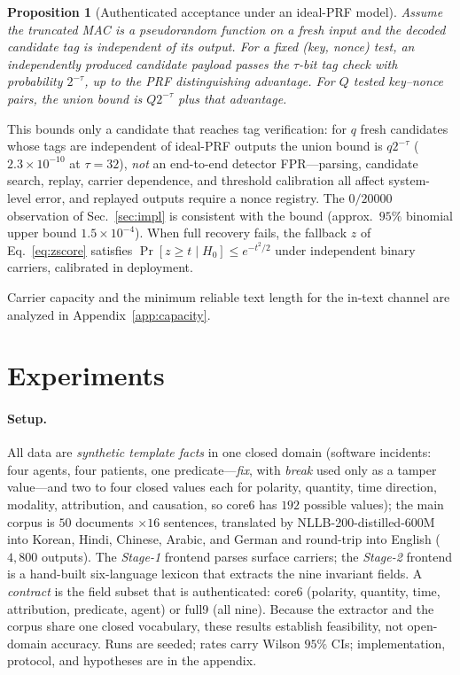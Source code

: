 \documentclass[journal]{IEEEtran}
\newtheorem{proposition}{Proposition}
\begin{document}
\begin{proposition}[Authenticated acceptance under an ideal-PRF model]
\label{thm:fpr}
Assume the truncated MAC is a pseudorandom function on a fresh input and the decoded candidate tag is independent of its output. For a fixed (key, nonce) test, an independently produced candidate payload passes the $\tau$-bit tag check with probability $2^{-\tau}$, up to the PRF distinguishing advantage. For $Q$ tested key--nonce pairs, the union bound is $Q2^{-\tau}$ plus that advantage.
\end{proposition}
This bounds only a candidate that reaches tag verification: for $q$ fresh candidates whose tags are independent of ideal-PRF outputs the union bound is $q2^{-\tau}$ ($2.3\times10^{-10}$ at $\tau{=}32$), \emph{not} an end-to-end detector FPR---parsing, candidate search, replay, carrier dependence, and threshold calibration all affect system-level error, and replayed outputs require a nonce registry. The $0/20000$ observation of Sec.~\ref{sec:impl} is consistent with the bound (approx.\ $95\%$ binomial upper bound $1.5\times10^{-4}$). When full recovery fails, the fallback $z$ of Eq.~\eqref{eq:zscore} satisfies $\Pr[z\ge t\mid H_0]\le e^{-t^2/2}$ under independent binary carriers, calibrated in deployment.

Carrier capacity and the minimum reliable text length for the in-text channel are analyzed in Appendix~\ref{app:capacity}.

\section{Experiments}
\label{sec:experiments}
\paragraph{Setup.} All data are \emph{synthetic template facts} in one closed domain (software incidents: four agents, four patients, one predicate---\emph{fix}, with \emph{break} used only as a tamper value---and two to four closed values each for polarity, quantity, time direction, modality, attribution, and causation, so core6 has $192$ possible values); the main corpus is $50$ documents $\times16$ sentences, translated by NLLB-200-distilled-600M into Korean, Hindi, Chinese, Arabic, and German and round-trip into English ($4{,}800$ outputs). The \emph{Stage-1} frontend parses surface carriers; the \emph{Stage-2} frontend is a hand-built six-language lexicon that extracts the nine invariant fields. A \emph{contract} is the field subset that is authenticated: core6 (polarity, quantity, time, attribution, predicate, agent) or full9 (all nine). Because the extractor and the corpus share one closed vocabulary, these results establish feasibility, not open-domain accuracy. Runs are seeded; rates carry Wilson $95\%$ CIs; implementation, protocol, and hypotheses are in the appendix.
\end{document}
